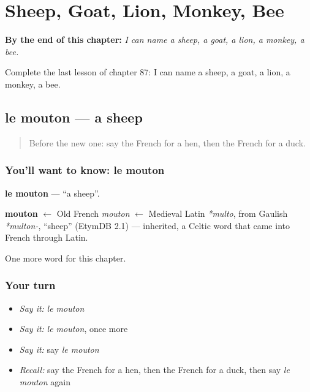 
\chapter{Sheep, Goat, Lion, Monkey, Bee}
\label{ch:fr-sheep-goat-lion-monkey-bee}

\begin{chapteropening}
\textbf{By the end of this chapter:} \emph{I can name a sheep, a goat, a lion, a monkey, a bee.}

Complete the last lesson of chapter 87: I can name a sheep, a goat, a lion, a monkey, a bee.
\end{chapteropening}

\section[le mouton]{le mouton — a sheep}

\label{lesson:FR-C87-mouton}



\begin{quote}
Before the new one: say the French for a hen, then the French for a duck.
\end{quote}

\subsection*{You'll want to know: le mouton}
\textbf{le mouton} — \textquotedblleft{}a sheep\textquotedblright{}.

\begin{cousinweb}
\textbf{mouton} $\leftarrow$ Old French \emph{mouton} $\leftarrow$ Medieval Latin \emph{*multo}, from Gaulish \emph{*multon-}, \textquotedblleft{}sheep\textquotedblright{} (EtymDB 2.1) — inherited, a Celtic word that came into French through Latin.
\end{cousinweb}

\begin{grammarlens}[title={What you've built}]
One more word for this chapter.
\end{grammarlens}

\subsection*{Your turn}
\begin{itemize}
\raggedright
  \item \emph{Say it:} \emph{le mouton}
  \item \emph{Say it:} \emph{le mouton}, once more
  \item \emph{Say it:} say \emph{le mouton}
  \item \emph{Recall:} say the French for a hen, then the French for a duck, then say \emph{le mouton} again
\end{itemize}

